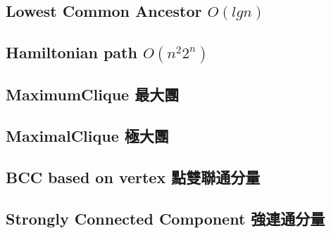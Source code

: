 \documentclass[a4paper,10pt,twocolumn,oneside]{article}
\begin{document}
\subsection{Lowest Common Ancestor $O(lgn)$}


\subsection{Hamiltonian path $O(n^{2}2^{n})$}


\subsection{MaximumClique 最大團}
% 


\subsection{MaximalClique 極大團}
% 


%

%

\subsection{BCC based on vertex 點雙聯通分量}


\subsection{Strongly Connected Component 強連通分量}


%
\end{document}
